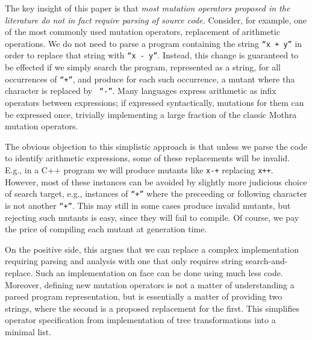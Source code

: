 \documentclass[acmsmall,screen,review,anonymous]{acmart}
\begin{document}
The key insight of this paper is that \emph{most mutation operators
  proposed in the literature do not in fact require parsing of source
  code.}  Consider, for example, one of the most commonly used
mutation operators, replacement of arithmetic operations.  We do not
need to parse a program containing the string {\tt ``x + y''} in order to
replace that string with {\tt ``x - y''}.  Instead, this change is
guaranteed to be effected if we simply search the program, represented
as a string, for all occurrences of  {\tt ``+''}, and produce for each
such occurrence, a mutant where tha character is replaced by {\tt
  ``-''}.  Many languages express arithmetic as infix operators between
expressions; if expressed syntactically, mutations for them can be expressed
once, trivially implementing a large fraction of the classic Mothra~\cite{offutt1996experimental}
mutation operators.

The obvious objection to this simplistic approach is that unless we
parse the code to identify arithmetic expressions, some of these
replacements will be invalid.  E.g., in a C++ program we will produce
mutants like {\tt x-+} replacing {\tt x++}.  However, most of these
instances can be avoided by slightly more judicious choice of search
target, e.g., instances of {\tt ``+''} where the preceeding or following
character is not another {\tt ``+''}.  This may still in some cases produce
invalid mutants, but rejecting such mutants is easy, since they will fail
to compile.  Of course, we pay the price of
compiling each mutant at generation
time.  

On the positive side, this argues that we can replace a
complex implementation requiring parsing and analysis with
one that only requires string search-and-replace.
Such an implementation on face can be done using much less code. 
Moreover, defining new mutation operators is not a matter of
understanding a parsed program representation, but is essentially
a matter of providing two strings, where the second is a proposed
replacement for the first.  This simplifies operator specification from
implementation of
tree transformations into a minimal list. 
\end{document}
